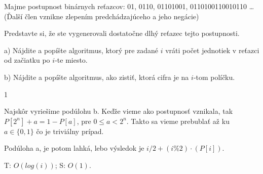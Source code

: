 
Majme postupnost binárnych reťazcov: 01, 0110, 01101001, 0110100110010110 \dots
(Ďalší člen vznikne zlepením predchádzajúceho a jeho negácie)

Predstavte si, že ste vygenerovali dostatočne dlhý reťazec tejto postupnosti.

a) Nájdite a popíšte algoritmus, ktorý pre zadané $i$ vráti počet jednotiek
v reťazci od začiatku po $i$-te miesto.

b) Nájdite a popíšte algoritmus, ako zistiť, ktorá cifra je na $i$-tom políčku.


1
\koniec

Najskôr vyriešime podúlohu b. Keďže vieme ako postupnosť vznikala, tak
$P[2^n] + a = 1-P[a]$, pre $0 \leq a < 2^n$. Takto sa vieme prebublať až ku
$a \in \{0,1\}$ čo je triviálny prípad. 

Podúloha a, je potom lahká, lebo výsledok je $i/2 + (i\%2) \cdot (P[i])$.

T: $O(log(i))$; S: $O(1)$.
